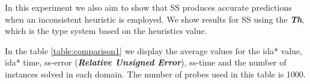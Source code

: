 \documentclass[11pt,a4paper,oneside]{report}
\begin{document}
In this experiment we also aim to show that SS produces accurate predictions when an inconsistent heuristic is employed. We show results for SS using the \textit{\textbf{Th}}, which is the type system based on the heuristics value.
\newline

In the table \ref{table:comparison1} we display the average values for the ida* value, ida* time, ss-error (\textit{\textbf{Relative Unsigned Error}}), ss-time and the number of instances solved in each domain. The number of probes used in this table is 1000.


\footnotesize  %
\setlength\LTleft{100pt}            %
\setlength\LTright{200pt}           %
\begin{longtable}{@{\extracolsep{\fill}} llllll @{}}
\hline


\end{longtable}
\end{document}

